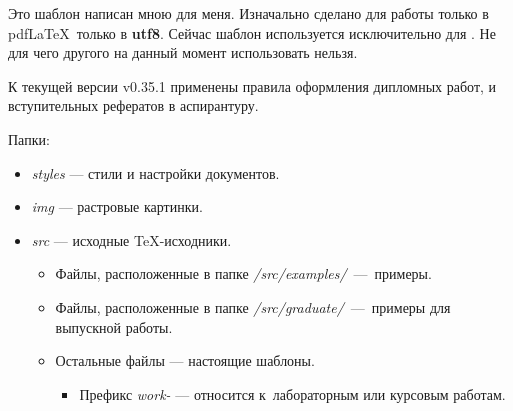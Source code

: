 

Это шаблон написан мною для меня.
Изначально сделано для работы только в pdf\LaTeX \ только в \textbf{utf8}.
Сейчас шаблон используется исключительно для  \XeTeX.
Не для чего другого на данный момент использовать нельзя.

К текущей версии {\color{teal} v0.35.1} применены правила оформления
дипломных работ, и вступительных рефератов в аспирантуру.

Папки: 
\begin{itemize}
	\item \textit{styles} --- стили и настройки документов.
	\item \textit{img} --- растровые картинки.
	\item \textit{src} --- исходные \TeX-исходники.
	\begin{itemize}
		\item Файлы, расположенные в папке \textit{/src/examples/}~---~примеры.
        \item Файлы, расположенные в папке \textit{/src/graduate/}~---~примеры
            для выпускной работы.
		\item Остальные файлы --- настоящие шаблоны.
		\begin{itemize}
			\item Префикс \textit{work-} --- относится к~лабораторным
			или курсовым работам.
		\end{itemize}	
	\end{itemize}
\end{itemize}


\pagebreak

